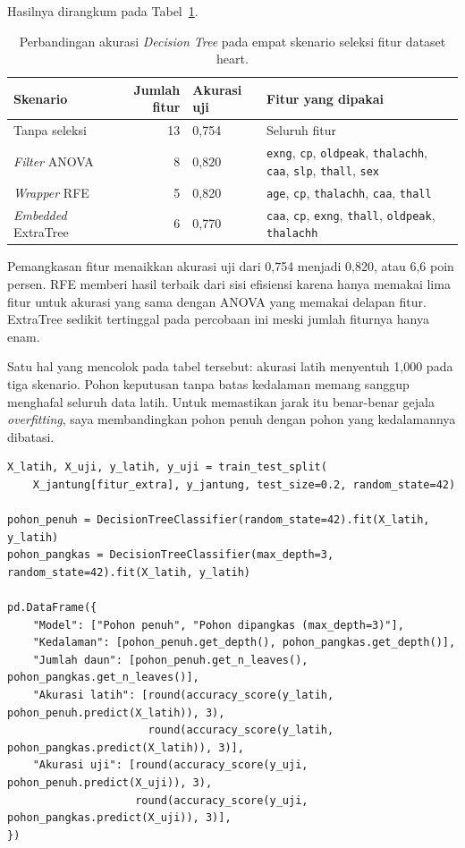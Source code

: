 \documentclass[a4paper,oneside,12pt]{report}
\begin{document}
Hasilnya dirangkum pada Tabel~\ref{tab:seleksi}.

\begin{table}[H]
\centering
\caption{Perbandingan akurasi \textit{Decision Tree} pada empat skenario seleksi fitur dataset heart.}
\label{tab:seleksi}
\small
\begin{tabularx}{\linewidth}{|l|r|l|>{\raggedright\arraybackslash}X|}
\hline
\textbf{Skenario} & \textbf{Jumlah fitur} & \textbf{Akurasi uji} & \textbf{Fitur yang dipakai} \\
\hline
Tanpa seleksi & 13 & 0,754 & Seluruh fitur \\
\hline
\textit{Filter} ANOVA & 8 & 0,820 & \texttt{exng}, \texttt{cp}, \texttt{oldpeak}, \texttt{thalachh}, \texttt{caa}, \texttt{slp}, \texttt{thall}, \texttt{sex} \\
\hline
\textit{Wrapper} RFE & 5 & 0,820 & \texttt{age}, \texttt{cp}, \texttt{thalachh}, \texttt{caa}, \texttt{thall} \\
\hline
\textit{Embedded} ExtraTree & 6 & 0,770 & \texttt{caa}, \texttt{cp}, \texttt{exng}, \texttt{thall}, \texttt{oldpeak}, \texttt{thalachh} \\
\hline
\end{tabularx}
\end{table}

Pemangkasan fitur menaikkan akurasi uji dari 0,754 menjadi 0,820, atau 6,6 poin persen. RFE memberi hasil terbaik dari sisi efisiensi karena hanya memakai lima fitur untuk akurasi yang sama dengan ANOVA yang memakai delapan fitur. ExtraTree sedikit tertinggal pada percobaan ini meski jumlah fiturnya hanya enam.

Satu hal yang mencolok pada tabel tersebut: akurasi latih menyentuh 1,000 pada tiga skenario. Pohon keputusan tanpa batas kedalaman memang sanggup menghafal seluruh data latih. Untuk memastikan jarak itu benar-benar gejala \textit{overfitting}, saya membandingkan pohon penuh dengan pohon yang kedalamannya dibatasi.

\begin{lstlisting}[style=pythonstyle,caption={Membandingkan pohon penuh dengan pohon yang dipangkas.}]
X_latih, X_uji, y_latih, y_uji = train_test_split(
    X_jantung[fitur_extra], y_jantung, test_size=0.2, random_state=42)

pohon_penuh = DecisionTreeClassifier(random_state=42).fit(X_latih, y_latih)
pohon_pangkas = DecisionTreeClassifier(max_depth=3, random_state=42).fit(X_latih, y_latih)

pd.DataFrame({
    "Model": ["Pohon penuh", "Pohon dipangkas (max_depth=3)"],
    "Kedalaman": [pohon_penuh.get_depth(), pohon_pangkas.get_depth()],
    "Jumlah daun": [pohon_penuh.get_n_leaves(), pohon_pangkas.get_n_leaves()],
    "Akurasi latih": [round(accuracy_score(y_latih, pohon_penuh.predict(X_latih)), 3),
                      round(accuracy_score(y_latih, pohon_pangkas.predict(X_latih)), 3)],
    "Akurasi uji": [round(accuracy_score(y_uji, pohon_penuh.predict(X_uji)), 3),
                    round(accuracy_score(y_uji, pohon_pangkas.predict(X_uji)), 3)],
})
\end{lstlisting}
\end{document}
